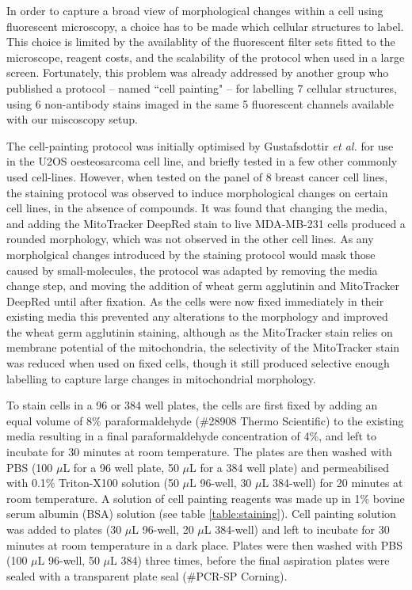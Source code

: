 \documentclass[a4paper,11pt,twoside,openright]{scrbook}
\begin{document}
In order to capture a broad view of morphological changes within a cell using fluorescent microscopy, a choice has to 
be made which cellular structures to label.
This choice is limited by the availablity of the fluorescent filter sets fitted to the microscope, reagent costs, and 
the scalability of the protocol when used in a large screen.
Fortunately, this problem was already addressed by another group who published a protocol -- named ``cell painting" -- 
for labelling 7 cellular structures, using 6 non-antibody stains imaged in the same 5 fluorescent channels available 
with our miscoscopy setup. \cite{Gustafsdottir2013, Bray2016}

The cell-painting protocol was initially optimised by Gustafsdottir \textit{et al.} for use in the U2OS oesteosarcoma 
cell line, and briefly tested in a few other commonly used cell-lines.
However, when tested on the panel of 8 breast cancer cell lines, the staining protocol was observed to induce 
morphological changes on certain cell lines, in the absence of compounds.
It was found that changing the media, and adding the MitoTracker DeepRed stain to live MDA-MB-231 cells produced a 
rounded morphology, which was not observed in the other cell lines.
As any morpholgical changes introduced by the staining protocol would mask those caused by small-molecules, the 
protocol was adapted by removing the media change step, and moving the addition of wheat germ agglutinin and 
MitoTracker DeepRed until after fixation.
As the cells were now fixed immediately in their existing media this prevented any alterations to the morphology and 
improved the wheat germ agglutinin staining, although as the MitoTracker stain relies on membrane potential of the 
mitochondria, the selectivity of the MitoTracker stain was reduced when used on fixed cells, though it still produced 
selective enough labelling to capture large changes in mitochondrial morphology.

To stain cells in a 96 or 384 well plates, the cells are first fixed by adding an equal volume of 8\% paraformaldehyde 
(\#28908 Thermo Scientific) to the existing media resulting in a final paraformaldehyde concentration of 4\%, and left 
to incubate for 30 minutes at room temperature.
The plates are then washed with PBS (100 $\mu$L for a 96 well plate, 50 $\mu$L for a 384 well plate) and permeabilised 
with 0.1\% Triton-X100 solution (50 $\mu$L 96-well, 30 $\mu$L 384-well) for 20 minutes at room temperature.
A solution of cell painting reagents was made up in 1\% bovine serum albumin (BSA) solution (see table 
\ref{table:staining}).
Cell painting solution was added to plates (30 $\mu$L 96-well, 20 $\mu$L 384-well) and left to incubate for 30 minutes 
at room temperature in a dark place.
Plates were then washed with PBS (100 $\mu$L 96-well, 50 $\mu$L 384) three times, before the final aspiration plates 
were sealed with a transparent plate seal (\#PCR-SP Corning).
\end{document}
